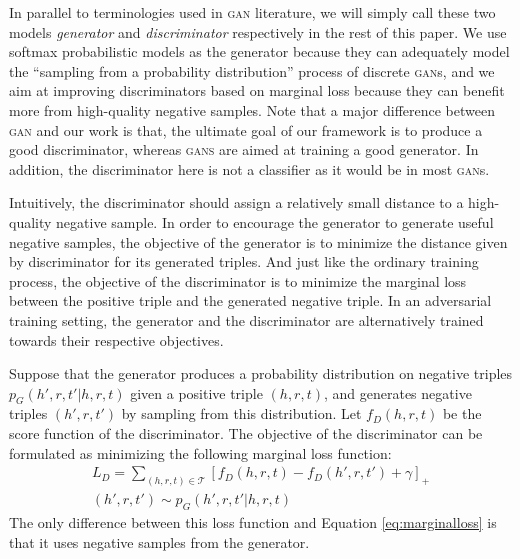 \documentclass[11pt,a4paper]{article}
\begin{document}
In parallel to terminologies used in \textsc{gan} literature, we will simply call these two models \emph{generator} and \emph{discriminator} respectively in the rest of this paper. We use softmax probabilistic models as the generator because they can adequately model the ``sampling from a probability distribution'' process of discrete \textsc{gan}s, and we aim at improving discriminators based on marginal loss because they can benefit more from high-quality negative samples. Note that a major difference between \textsc{gan} and our work is that, the ultimate goal of our framework is to produce a good discriminator, whereas \textsc{gans} are aimed at training a good generator. In addition, the discriminator here is not a classifier as it would be in most \textsc{gan}s. 

Intuitively, the discriminator should assign a relatively small distance to a high-quality negative sample. In order to encourage the generator to generate useful negative samples, the objective of the generator is to minimize the distance given by discriminator for its generated triples. And just like the ordinary training process, the objective of the discriminator is to minimize the marginal loss between the positive triple and the generated negative triple. In an adversarial training setting, the generator and the discriminator are alternatively trained towards their respective objectives.

Suppose that the generator produces a probability distribution on negative triples $p_G(h',r,t'|h,r,t)$ given a positive triple $(h,r,t)$, and generates negative triples $(h',r,t')$ by sampling from this distribution. Let $f_D(h,r,t)$ be the score function of the discriminator. The objective of the discriminator can be formulated as minimizing the following marginal loss function:
\begin{multline}
L_D=\sum_{(h,r,t)\in\mathcal{T}}[f_D(h,r,t)-f_D(h',r,t')+\gamma]_+ \\
(h',r,t')\sim p_G(h',r,t'|h,r,t)
\end{multline}
The only difference between this loss function and Equation \ref{eq:marginalloss} is that it uses negative samples from the generator.
\end{document}

